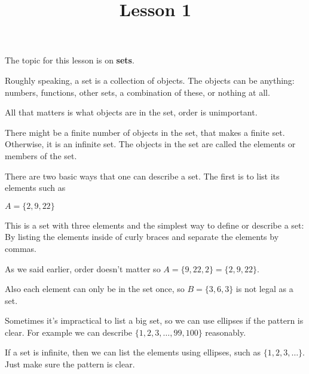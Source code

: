 \documentclass[10pt,a4paper,oneside]{book}
\title{Lesson 1}
\author{}
\date{}
\begin{document}
\maketitle

The topic for this lesson is on \textbf{sets}.

Roughly speaking, a set is a collection of objects. The objects can be anything: numbers, functions, other sets, a combination of these, or nothing at all.

All that matters is what objects are in the set, order is unimportant.

There might be a finite number of objects in the set, that makes a finite set. Otherwise, it is an infinite set. The objects in the set are called the elements or members of the set.

There are two basic ways that one can describe a set. The first is to list its elements such as 
\begin{center}
    $A = \{2,9,22\}$
\end{center}

This is a set with three elements and the simplest way to define or describe a set: By listing the elements inside of curly braces and separate the elements by commas.

As we said earlier, order doesn't matter so $A=\{9,22,2\} = \{2,9,22\}$.

Also each element can only be in the set once, so $B=\{3,6,3\}$ is not legal as a set.

Sometimes it's impractical to list a big set, so we can use ellipses if the pattern is clear. For example
we can describe $\{1,2,3,\dots,99,100\}$ reasonably.

If a set is infinite, then we can list the elements using ellipses, such as $\{1,2,3,\dots\}$. Just make sure the pattern is clear.
\end{document}
